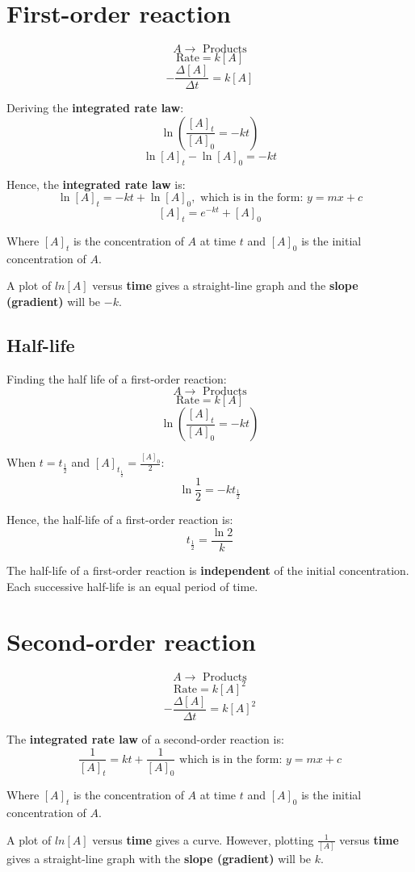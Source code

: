 \documentclass[11pt]{article}
\begin{document}
\newpage
\section{First-order reaction}
\label{sec:org37bcae3}
\[A \rightarrow \text{ Products}\]
\[\text{Rate} = k[A]\]
\[- \frac{\Delta [A]}{\Delta t} = k[A]\]

Deriving the \textbf{integrated rate law}:
\[\ln \left( \frac{[A]_t}{[A]_0} = -kt \right)\]
\[\ln [A]_t - \ln [A]_0 = -kt\]

Hence, the \textbf{integrated rate law} is:
\[\ln [A]_t = -kt + \ln [A]_0, \text{ which is in the form: } y = mx + c\]
\[[A]_t = e^{-kt} + [A]_0\]

Where \([A]_t\) is the concentration of \(A\) at time \(t\) and \([A]_0\) is the initial concentration of \(A\).


A plot of \(ln[A]\) versus \textbf{time} gives a straight-line graph and the \textbf{slope (gradient)} will be \(-k\).
\subsection{Half-life}
\label{sec:org60543ff}

Finding the half life of a first-order reaction:
\[A \rightarrow \text{ Products}\]
\[\text{Rate} = k[A]\]
\[\ln \left( \frac{[A]_t}{[A]_0} = -kt \right)\]

When \(t = t_{\frac{1}{2}}\) and \([A]_{t_{\frac{1}{2}}} = \frac{[A]_0}{2}\):
\[\ln \frac{1}{2} = -kt_{\frac{1}{2}}\]

Hence, the half-life of a first-order reaction is:
\[t_{\frac{1}{2}} = \frac{\ln 2}{k}\]

The half-life of a first-order reaction is \textbf{independent} of the initial concentration. Each successive half-life is an equal period of time.
\section{Second-order reaction}
\label{sec:org1cab528}
\[A \rightarrow \text{ Products}\]
\[\text{Rate} = k[A]^2\]
\[- \frac{\Delta [A]}{\Delta t} = k[A]^2\]

The \textbf{integrated rate law} of a second-order reaction is:
\[\frac{1}{[A]_t} = kt + \frac{1}{[A]_0} \text{ which is in the form: } y = mx + c\]

Where \([A]_t\) is the concentration of \(A\) at time \(t\) and \([A]_0\) is the initial concentration of \(A\).


A plot of \(ln[A]\) versus \textbf{time} gives a curve. However, plotting \(\frac{1}{[A]}\) versus \textbf{time} gives a straight-line graph with the \textbf{slope (gradient)} will be \(k\).
\end{document}
